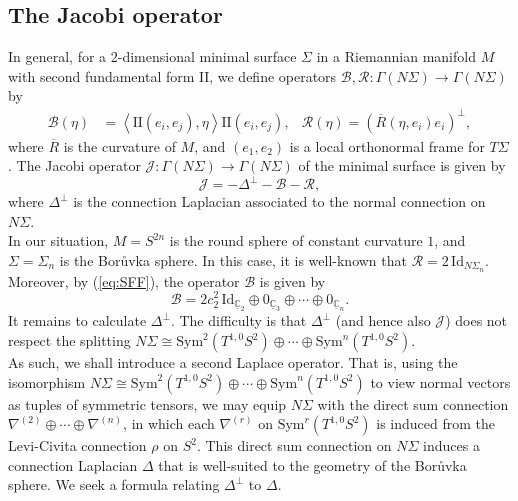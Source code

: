 \documentclass[11pt]{article}
\newcommand{\Sym}{\mathrm{Sym}}
\newcommand{\uC}{\underline{\mathbb{C}}}
\theoremstyle{definition}
\numberwithin{equation}{section}
\begin{document}
\subsection{The Jacobi operator}

\indent \indent In general, for a $2$-dimensional minimal surface $\Sigma$ in a Riemannian manifold $M$ with second fundamental form $\mathrm{I\!I}$, we define operators $\mathscr{B}, \mathscr{R} \colon\Gamma(N\Sigma) \to \Gamma(N\Sigma)$ by
\begin{align*}
\mathscr{B}(\eta) & = \left\langle \mathrm{I\!I}(e_i, e_j), \eta \right\rangle \mathrm{I\!I}(e_i, e_j), & \mathscr{R}(\eta) = \left( \overline{R}(\eta, e_i)e_i \right)^\perp,
\end{align*}
where $\overline{R}$ is the curvature of $M$, and $(e_1, e_2)$ is a local orthonormal frame for $T\Sigma$.  The Jacobi operator  $\mathscr{J} \colon \Gamma(N\Sigma) \to \Gamma(N\Sigma)$ of the minimal surface is given by
\begin{equation*}
    \mathscr{J} = - \Delta^\perp - \mathscr{B} - \mathscr{R},
\end{equation*}
where $\Delta^\perp$ is the connection Laplacian associated to the normal connection on $N\Sigma$. \\
\indent In our situation, $M = S^{2n}$ is the round sphere of constant curvature $1$, and $\Sigma = \Sigma_n$ is the Bor{\r{u}}vka sphere.  In this case, it is well-known that $\mathscr{R} = 2 \, \mathrm{Id}_{N\Sigma_n}$.  Moreover, by (\ref{eq:SFF}), the operator $\mathscr{B}$ is given by
\begin{equation*}
        \mathscr{B} = 2 c_2^2 \, \mathrm{Id}_{\uC_2} \oplus 0_{\uC_3}  \oplus \cdots \oplus 0_{\uC_n}.
\end{equation*}
It remains to calculate $\Delta^\perp$.  The difficulty is that $\Delta^\perp$ (and hence also $\mathscr{J}$) does not respect the splitting $N\Sigma \cong \Sym^2(T^{1,0}S^2) \oplus \cdots \oplus \Sym^n(T^{1,0}S^2)$. \\
\indent As such, we shall introduce a second Laplace operator.  That is, using the isomorphism $N\Sigma \cong \Sym^2(T^{1,0}S^2) \oplus \cdots \oplus \Sym^n(T^{1,0}S^2)$ to view normal vectors as tuples of symmetric tensors, we may equip $N\Sigma$ with the direct sum connection $\nabla^{(2)} \oplus \cdots \oplus \nabla^{(n)}$, in which each $\nabla^{(r)}$ on $\Sym^r(T^{1,0}S^2)$ is induced from the Levi-Civita connection $\rho$ on $S^2$.  This direct sum connection on $N\Sigma$ induces a connection Laplacian $\Delta$ that is well-suited to the geometry of the Bor{\r{u}}vka sphere.  We seek a formula relating $\Delta^\perp$ to $\Delta$. \\
\end{document}
